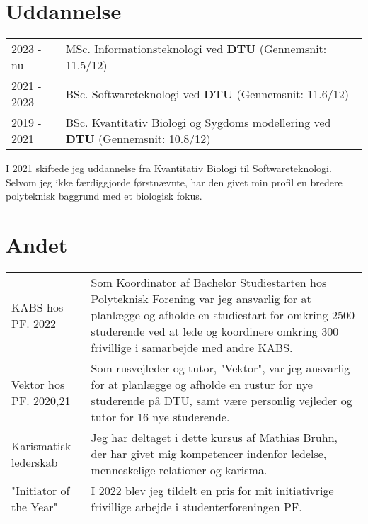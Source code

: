 \documentclass[a4paper,12pt]{article}
\begin{document}
\section{Uddannelse}
\begin{tabularx}{\linewidth}{@{}l X@{}}	
2023 - nu & MSc. Informationsteknologi ved \textbf{DTU} \hfill \normalsize (Gennemsnit: 11.5/12) \\

2021 - 2023 & BSc. Softwareteknologi ved \textbf{DTU} \hfill (Gennemsnit: 11.6/12) \\ 

2019 - 2021 & BSc. Kvantitativ Biologi og Sygdoms modellering ved \textbf{DTU} \hfill  (Gennemsnit: 10.8/12) \\
\end{tabularx}\vspace{5pt}
I 2021 skiftede jeg uddannelse fra Kvantitativ Biologi til Softwareteknologi. Selvom jeg ikke færdiggjorde førstnævnte, har den givet min profil en bredere polyteknisk baggrund med et biologisk fokus. 


\section{Andet}
\begin{tabularx}{\linewidth}{@{}l X@{}}
KABS hos PF. 2022 & \normalsize{Som Koordinator af Bachelor Studiestarten hos Polyteknisk Forening var jeg ansvarlig for at planlægge og afholde en studiestart for omkring 2500 studerende ved at lede og koordinere omkring 300 frivillige i samarbejde med andre KABS.}\\
Vektor hos PF. 2020,21  &  \normalsize{Som rusvejleder og tutor, "Vektor", var jeg ansvarlig for at planlægge og afholde en rustur for nye studerende på DTU, samt være personlig vejleder og tutor for 16 nye studerende. }\\  
Karismatisk lederskab & \normalsize{Jeg har deltaget i dette kursus af Mathias Bruhn, der har givet mig kompetencer indenfor ledelse, menneskelige relationer og karisma.}\\
"Initiator of the Year" & \normalsize{I 2022 blev jeg tildelt en pris for mit initiativrige frivillige arbejde i studenterforeningen PF. }
\end{tabularx}

\vfill
{}
\end{document}
